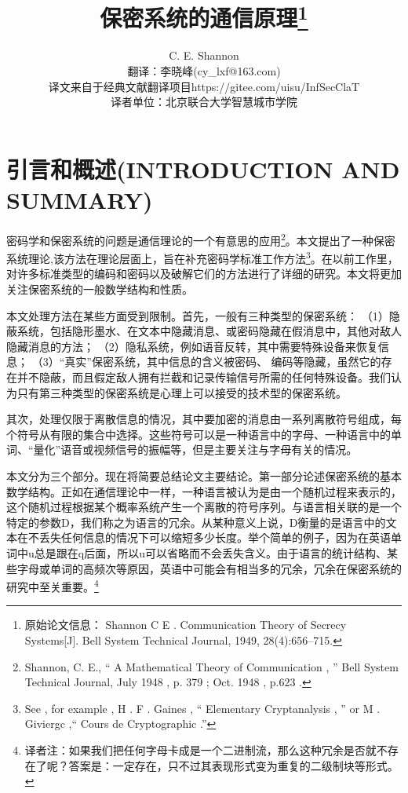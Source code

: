 \documentclass[]{article}
\title{保密系统的通信原理\footnote{原始论文信息： Shannon C E . Communication Theory of Secrecy Systems[J]. Bell System Technical Journal, 1949, 28(4):656–715.}}
\author{C. E. Shannon\\
{\small  翻译：李晓峰(cy\_lxf@163.com)}\\
{\small  译文来自于经典文献翻译项目https://gitee.com/uisu/InfSecClaT}\\
{\small 译者单位：北京联合大学智慧城市学院}
}
\begin{document}
	
\maketitle
	

%   
%
	
	\section{引言和概述(INTRODUCTION AND SUMMARY)}
	密码学和保密系统的问题是通信理论的一个有意思的应用\footnote{Shannon, C. E., “ A Mathematical Theory of Communication , ”
	Bell System Technical Journal, July 1948 , p. 379 ; Oct. 1948 , p.623 .}。本文提出了一种保密系统理论,该方法在理论层面上，旨在补充密码学标准工作方法\footnote{See , for example , H . F . Gaines , “ Elementary Cryptanalysis , ” or M . Giviergc ,“ Cours de Cryptographic .”}。在以前工作里，对许多标准类型的编码和密码以及破解它们的方法进行了详细的研究。本文将更加关注保密系统的一般数学结构和性质。\par


本文处理方法在某些方面受到限制。首先，一般有三种类型的保密系统：
（1）隐蔽系统，包括隐形墨水、在文本中隐藏消息、或密码隐藏在假消息中，其他对敌人隐藏消息的方法；
（2）隐私系统，例如语音反转，其中需要特殊设备来恢复信息；
（3）“真实”保密系统，其中信息的含义被密码、
编码等隐藏，虽然它的存在并不隐蔽，而且假定敌人拥有拦截和记录传输信号所需的任何特殊设备。我们认为只有第三种类型的保密系统是心理上可以接受的技术型的保密系统。
\par

其次，处理仅限于离散信息的情况，其中要加密的消息由一系列离散符号组成，每个符号从有限的集合中选择。这些符号可以是一种语言中的字母、一种语言中的单词、“量化”语音或视频信号的振幅等，但是主要关注与字母有关的情况。
\par

本文分为三个部分。现在将简要总结论文主要结论。第一部分论述保密系统的基本数学结构。正如在通信理论中一样，一种语言被认为是由一个随机过程来表示的，这个随机过程根据某个概率系统产生一个离散的符号序列。与语言相关联的是一个特定的参数D，我们称之为语言的冗余。从某种意义上说，D衡量的是语言中的文本在不丢失任何信息的情况下可以缩短多少长度。举个简单的例子，因为在英语单词中u总是跟在q后面，所以u可以省略而不会丢失含义。由于语言的统计结构、某些字母或单词的高频次等原因，英语中可能会有相当多的冗余，冗余在保密系统的研究中至关重要。\footnote{译者注：如果我们把任何字母卡成是一个二进制流，那么这种冗余是否就不存在了呢？答案是：一定存在，只不过其表现形式变为重复的二级制块等形式。}
\par
\end{document}
